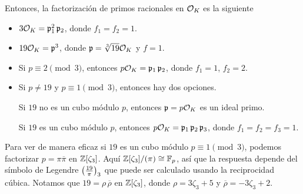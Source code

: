 \begin{ejemplo}
  Entonces, la factorización de primos racionales en $\mathcal{O}_K$ es la siguiente

  \begin{itemize}
  \item $3\mathcal{O}_K = \mathfrak{p}_1^2 \, \mathfrak{p}_2$, donde $f_1 = f_2 = 1$.

  \item $19\mathcal{O}_K = \mathfrak{p}^3$, donde $\mathfrak{p} = \sqrt[3]{19}\mathcal{O}_K$ y
    $f = 1$.

  \item Si $p \equiv 2 \pmod{3}$, entonces
    $p\mathcal{O}_K = \mathfrak{p}_1 \, \mathfrak{p}_2$, donde $f_1 = 1$, $f_2 = 2$.

  \item Si $p \ne 19$ y $p \equiv 1 \pmod{3}$, entonces hay dos opciones.

    Si $19$ no es un cubo módulo $p$, entonces $\mathfrak{p} = p\mathcal{O}_K$ es un
    ideal primo.

    Si $19$ es un cubo módulo $p$, entonces
    $p\mathcal{O}_K = \mathfrak{p}_1 \, \mathfrak{p}_2 \, \mathfrak{p}_3$, donde
    $f_1 = f_2 = f_3 = 1$.
  \end{itemize}

  Para ver de manera eficaz si $19$ es un cubo módulo $p \equiv 1 \pmod{3}$,
  podemos factorizar $p = \pi \overline{\pi}$ en $\mathbb{Z} [\zeta_3]$.
  Aquí $\mathbb{Z} [\zeta_3]/(\pi) \cong \mathbb{F}_p$, así que la respuesta depende del
  símbolo de Legendre $\left(\frac{19}{\pi}\right)_3$ que puede ser calculado usando
  la reciprocidad cúbica. Notamos que $19 = \rho\,\overline{\rho}$ en
  $\mathbb{Z} [\zeta_3]$, donde $\rho = 3\zeta_3 + 5$ y
  $\overline{\rho} = -3\zeta_3 + 2$.
\end{ejemplo}

